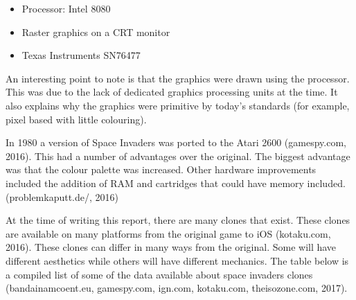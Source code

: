 \documentclass[12pt]{article}
\begin{document}
\begin{itemize}
	\item Processor: Intel 8080
	\item Raster graphics on a CRT monitor
	\item Texas Instruments SN76477
\end{itemize}

An interesting point to note is that the graphics were drawn using the processor. This was due to the lack of dedicated graphics processing units at the time. It also explains why the graphics were primitive by today's standards (for example, pixel based with little colouring).

In 1980 a version of Space Invaders was ported to the Atari 2600 (gamespy.com, 2016). This had a number of advantages over the original. The biggest advantage was that the colour palette was increased. Other hardware improvements included the addition of RAM and cartridges that could have memory included. (problemkaputt.de/, 2016)

At the time of writing this report, there are many clones that exist. These clones are available on many platforms from the original game to iOS (kotaku.com, 2016). These clones can differ in many ways from the original. Some will have different aesthetics while others will have different mechanics. The table below is a compiled list of some of the data available about space invaders clones (bandainamcoent.eu, gamespy.com, ign.com, kotaku.com, theisozone.com, 2017).
\end{document}

